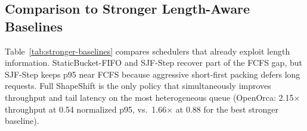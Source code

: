 \documentclass[a4paper]{llncs}
\begin{document}
\subsection{Comparison to Stronger Length-Aware Baselines}

Table~\ref{tab:stronger-baselines} compares schedulers that already exploit length information. StaticBucket-FIFO and SJF-Step recover part of the FCFS gap, but SJF-Step keeps p95 near FCFS because aggressive short-first packing defers long requests. Full ShapeShift is the only policy that simultaneously improves throughput and tail latency on the most heterogeneous queue (OpenOrca: 2.15$\times$ throughput at 0.54 normalized p95, vs.\ 1.66$\times$ at 0.88 for the best stronger baseline).

\begin{table}[t]
\centering
\caption{Stronger scheduler baselines on the LLaDA-8B matrix. Each cell reports throughput speedup over FCFS and p95 latency normalized to FCFS.}
\label{tab:stronger-baselines}
\scriptsize
\setlength{\tabcolsep}{3.0pt}
\end{table}
\end{document}
